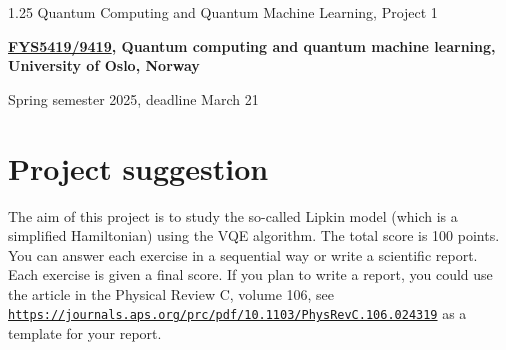 \documentclass[%
oneside,                 %
final,                   %
10pt]{article}
\begin{document}

\newcommand{\exercisesection}[1]{\subsection*{#1}}






\thispagestyle{empty}

\begin{center}
{\LARGE\bf
\begin{spacing}{1.25}
Quantum Computing and Quantum Machine Learning, Project 1
\end{spacing}
}
\end{center}


\begin{center}
{\bf \href{{https://www.uio.no/studier/emner/matnat/fys/FYS5419/index-eng.html}}{FYS5419/9419}, Quantum computing and quantum machine learning, University of Oslo, Norway${}^{}$} \\ [0mm]
\end{center}

\begin{center}
\end{center}
    

\begin{center}
Spring semester 2025, deadline March 21
\end{center}

\vspace{1cm}


\section{Project suggestion}

The aim of this project is to study the so-called Lipkin model (which is a simplified Hamiltonian) using the VQE algorithm.
The total score is 100 points. You can answer each exercise in a sequential way or write a scientific report. Each exercise is given a final score.
If you plan to write a report, you could use the article in the Physical Review C, volume 106, see \href{{https://journals.aps.org/prc/pdf/10.1103/PhysRevC.106.024319}}{\nolinkurl{https://journals.aps.org/prc/pdf/10.1103/PhysRevC.106.024319}} as a template for your report.
\end{document}
